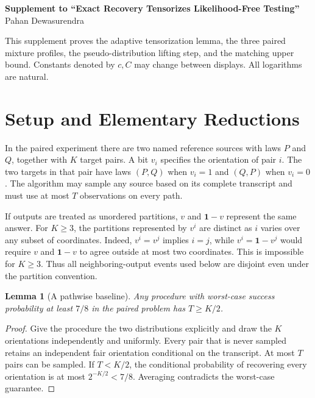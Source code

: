 \documentclass{article}
\newtheorem{lemma}[theorem]{Lemma}
\newcommand{\one}{\mathbf 1}
\begin{document}
\runningauthor{}
\onecolumn
\begin{center}
{\Large\bfseries Supplement to ``Exact Recovery Tensorizes Likelihood-Free Testing''}\\[0.75em]
Pahan Dewasurendra
\end{center}

This supplement proves the adaptive tensorization lemma, the three paired mixture profiles, the pseudo-distribution lifting step, and the matching upper bound. Constants denoted by $c,C$ may change between displays. All logarithms are natural.

\section{Setup and Elementary Reductions}

In the paired experiment there are two named reference sources with laws $P$ and $Q$, together with $K$ target pairs. A bit $v_i$ specifies the orientation of pair $i$. The two targets in that pair have laws $(P,Q)$ when $v_i=1$ and $(Q,P)$ when $v_i=0$. The algorithm may sample any source based on its complete transcript and must use at most $T$ observations on every path.

If outputs are treated as unordered partitions, $v$ and $\one-v$ represent the same answer. For $K\geq3$, the partitions represented by $v^i$ are distinct as $i$ varies over any subset of coordinates. Indeed, $v^i=v^j$ implies $i=j$, while $v^i=\one-v^j$ would require $v$ and $\one-v$ to agree outside at most two coordinates. This is impossible for $K\geq3$. Thus all neighboring-output events used below are disjoint even under the partition convention.

\begin{lemma}[A pathwise baseline]
\label{lem:baseline}
Any procedure with worst-case success probability at least $7/8$ in the paired problem has $T\geq K/2$.
\end{lemma}

\begin{proof}
Give the procedure the two distributions explicitly and draw the $K$ orientations independently and uniformly. Every pair that is never sampled retains an independent fair orientation conditional on the transcript. At most $T$ pairs can be sampled. If $T<K/2$, the conditional probability of recovering every orientation is at most $2^{-K/2}<7/8$. Averaging contradicts the worst-case guarantee.
\end{proof}
\end{document}
